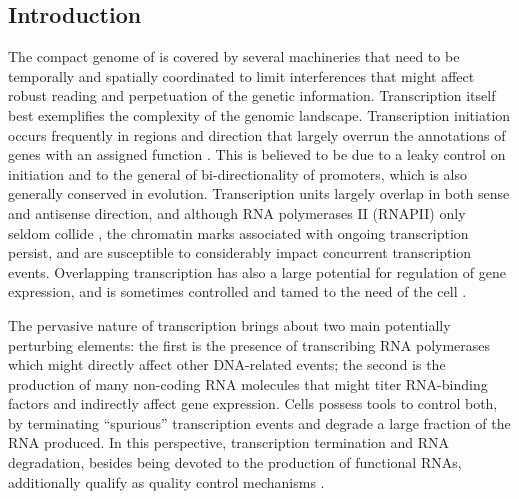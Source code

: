 \subsection{Introduction}

The compact genome of \cer{} is covered by several machineries that need to be temporally and spatially coordinated to limit interferences that might affect robust reading and perpetuation of the genetic information. Transcription itself best exemplifies the complexity of the genomic landscape. Transcription initiation occurs frequently in regions and direction that largely overrun the annotations of genes with an assigned function \cite{david:2006:highresolution, xu:2009:bidirectional}. This is believed to be due to a leaky control on initiation and to the general of bi-directionality of promoters, which is also generally conserved in evolution. Transcription units largely overlap in both sense and antisense direction, and although RNA polymerases II (RNAPII) only seldom collide \cite{zenklusen:2008:singlerna}, the chromatin marks associated with ongoing transcription persist, and are susceptible to considerably impact concurrent transcription events. Overlapping transcription has also a large potential for regulation of gene expression, and is sometimes controlled and  tamed to the need of the cell \cite{martens:2004:intergenic}. 

The pervasive nature of transcription brings about two main potentially perturbing elements: the first is the presence of transcribing RNA polymerases which might directly affect other DNA-related events; the second is the production of many non-coding RNA molecules that might titer RNA-binding factors and indirectly affect gene expression. Cells possess tools to control both, by terminating “spurious” transcription events and degrade a large fraction of the RNA produced. In this perspective, transcription termination and RNA degradation, besides being devoted to the production of functional RNAs, additionally qualify as quality control mechanisms \cite[for review see][]{tudek:2015:noncoding}. 

